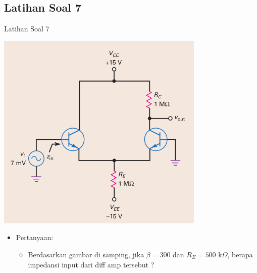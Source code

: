 \documentclass[aspectratio=169]{beamer}
\begin{document}
\subsection{Latihan Soal 7}
\begin{frame}{Latihan Soal 7}
	\begin{multicols}{2}
		\begin{center}
			\includegraphics[height=0.7\textheight]{gambar/01.diff-amp/01.contoh_soal_07}
		\end{center}
		\columnbreak
		\begin{itemize}
			\item Pertanyaan:
			\begin{itemize}
				\item Berdasarkan gambar di samping, jika $ \beta = 300 $ dan $ R_E = 500 \text{ k}\Omega $, berapa impedansi input dari diff amp tersebut ?
			\end{itemize}
		\end{itemize}
	\end{multicols}
\end{frame}
\end{document}
